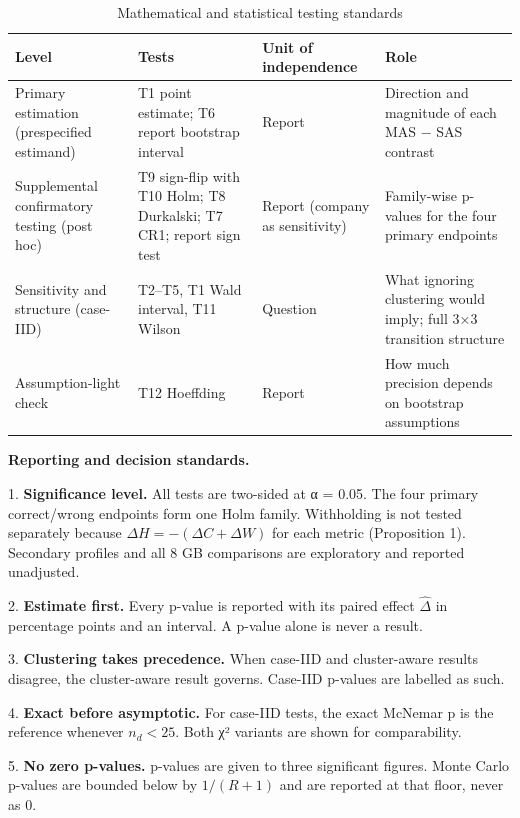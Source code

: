 \documentclass[letterpaper]{article}
\begin{document}
\begin{table}[tbp]
\centering
\setlength{\tabcolsep}{3pt}
\begin{tabular}{@{}>{\raggedright\arraybackslash}p{133.57pt}>{\raggedright\arraybackslash}p{130.87pt}>{\raggedright\arraybackslash}p{89.69pt}>{\raggedright\arraybackslash}p{131.86pt}@{}}
\toprule
\textbf{Level} & \textbf{Tests} & \textbf{Unit of independence} & \textbf{Role} \\
\midrule
Primary estimation (prespecified estimand) & T1 point estimate; T6 report bootstrap interval & Report & Direction and magnitude of each MAS − SAS contrast \\
Supplemental confirmatory testing (post hoc) & T9 sign-flip with T10 Holm; T8 Durkalski; T7 CR1; report sign test & Report (company as sensitivity) & Family-wise p-values for the four primary endpoints \\
Sensitivity and structure (case-IID) & T2–T5, T1 Wald interval, T11 Wilson & Question & What ignoring clustering would imply; full 3×3 transition structure \\
Assumption-light check & T12 Hoeffding & Report & How much precision depends on bootstrap assumptions \\
\bottomrule
\end{tabular}
\caption{Mathematical and statistical testing standards}
\end{table}

\textbf{Reporting and decision standards.}

1. \textbf{Significance level.} All tests are two-sided at α = 0.05. The four primary correct/wrong endpoints form one Holm family. Withholding is not tested separately because \(\Delta H=-(\Delta C+\Delta W)\) for each metric (Proposition 1). Secondary profiles and all 8 GB comparisons are exploratory and reported unadjusted.

2. \textbf{Estimate first.} Every p-value is reported with its paired effect \(\hat\Delta\) in percentage points and an interval. A p-value alone is never a result.

3. \textbf{Clustering takes precedence.} When case-IID and cluster-aware results disagree, the cluster-aware result governs. Case-IID p-values are labelled as such.

4. \textbf{Exact before asymptotic.} For case-IID tests, the exact McNemar p is the reference whenever \(n_d<25\). Both χ² variants are shown for comparability.

5. \textbf{No zero p-values.} p-values are given to three significant figures. Monte Carlo p-values are bounded below by \(1/(R+1)\) and are reported at that floor, never as 0.
\end{document}
